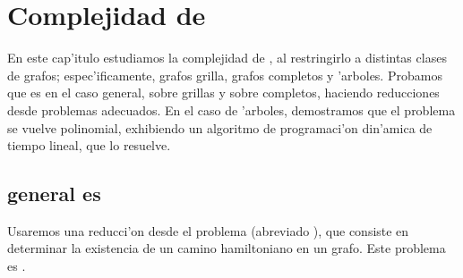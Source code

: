 \chapter{Complejidad de }
\label{ch:complejidad}

En este cap'itulo estudiamos la complejidad de , al restringirlo a distintas clases de grafos; espec'ificamente, grafos grilla, grafos completos y 'arboles. Probamos que es  en el caso general, sobre grillas y sobre completos, haciendo reducciones desde problemas adecuados. En el caso de 'arboles, demostramos que el problema se vuelve polinomial, exhibiendo un algoritmo de programaci'on din'amica de tiempo lineal, que lo resuelve.

\section{ general es }

Usaremos una reducci'on desde el problema  (abreviado ), que consiste en determinar la existencia de un camino hamiltoniano en un grafo. Este problema es  \cite[p. 60]{Ga79}.


